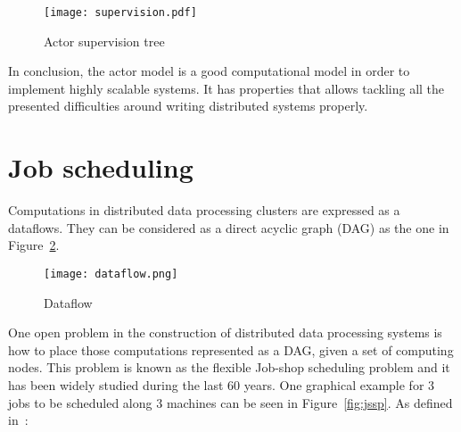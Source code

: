 \begin{figure}[!h]
\begin{center}
\texttt{[image: supervision.pdf]}
\caption{Actor supervision tree}
\label{fig:supervision}
\end{center}
\end{figure}

In conclusion, the actor model is a good computational model in order to
implement highly scalable systems. It has properties that allows tackling all
the presented difficulties around writing distributed systems properly.

\section{Job scheduling}

Computations in distributed data processing clusters are expressed as a
dataflows. They can be considered as a direct acyclic graph (DAG) as the one in
Figure~\ref{fig:dataflow}.

\begin{figure}[h!]
\begin{center}
\texttt{[image: dataflow.png]}
\caption{Dataflow}
\label{fig:dataflow}
\end{center}
\end{figure}

One open problem in the construction of distributed data processing systems is
how to place those computations represented as a \acs{DAG}, given a set of computing
nodes. This problem is known as the flexible Job-shop scheduling problem and it
has been widely studied during the last 60 years. One graphical example for $3$
jobs to be scheduled along $3$ machines can be seen in Figure~\ref{fig:jssp}.
As defined in~\cite{jobshop2}:

